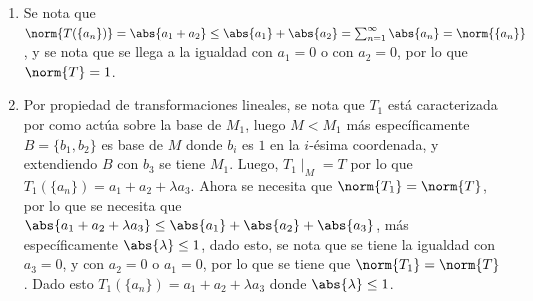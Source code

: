 \begin{sol}
    \begin{enumerate}
        \item Se nota que \(\norm{T(\{a_n\})}=\abs{a_1+a_2}\leq\abs{a_1}+\abs{a_2}=\sum_{n=1}^\infty\abs{a_n}=\norm{\{a_n\}}\), y se nota que se llega a la igualdad con \(a_1=0\) o con \(a_2=0\), por lo que \(\norm{T}=1\).
        \item Por propiedad de transformaciones lineales, se nota que \(T_1\) está caracterizada por como actúa sobre la base de \(M_1\), luego \(M<M_1\) más específicamente \(B=\{b_1,b_2\}\) es base de \(M\) donde \(b_i\) es \(1\) en la \(i\)-ésima coordenada, y extendiendo \(B\) con \(b_3\) se tiene \(M_1\). Luego, \(T_1\mid_M=T\) por lo que \(T_1(\{a_n\})=a_1+a_2+\lambda a_3\). Ahora se necesita que \(\norm{T_1}=\norm{T}\), por lo que se necesita que \(\abs{a_1+a_2+\lambda a_3}\leq\abs{a_1}+\abs{a_2}+\abs{a_3}\), más específicamente \(\abs{\lambda}\leq 1\), dado esto, se nota que se tiene la igualdad con \(a_3=0\), y con \(a_2=0\) o \(a_1=0\), por lo que se tiene que \(\norm{T_1}=\norm{T}\). Dado esto \(T_1(\{a_n\})=a_1+a_2+\lambda a_3\) donde \(\abs{\lambda}\leq 1\).
    \end{enumerate}
\end{sol}

